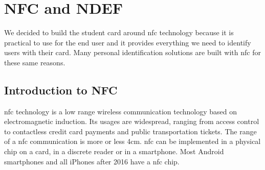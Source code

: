 \documentclass[twoside, openright,11pt,a4paper]{book}
\begin{document}
\section{NFC and NDEF}
We decided to build the student card around \gls{nfc} technology because it is practical to use for the end user and it provides everything we need to identify users with their card. Many personal identification solutions are built with \gls{nfc} for these same reasons.
\subsection{Introduction to NFC}
\gls{nfc} technology is a low range wireless communication technology based on electromagnetic induction. Its usages are widespread, ranging from access control to contactless credit card payments and public transportation tickets. The range of a \gls{nfc} communication is more or less 4cm. \gls{nfc} can be implemented in a physical chip on a card, in a discrete reader or in a smartphone. Most Android smartphones and all iPhones after 2016 have a \gls{nfc} chip. \\
\end{document}
